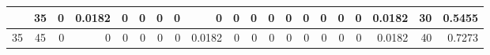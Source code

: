\begin{table}[ht]
\begin{adjustbox}{width = \textwidth, center}
\begin{tabular}{|cc|r|r|r|r|r|r|r|r|r|r|r|r|r|r|r|rrr|}
        \rowcolor[HTML]{FFFFFF} 
        \cellcolor[HTML]{C9DAF8}\enskip 25 \enskip             & \cellcolor[HTML]{EBF1FC}35             & 0                                              & \cellcolor[HTML]{DEF2E8}0.0182                 & 0                                              & 0                                              & 0                                              & 0                                              & 0                                              & 0                                               & 0                                               & 0                                               & 0                                               & 0                                               & 0                                               & 0                                               & 0                                               & \multicolumn{1}{r|}{\cellcolor[HTML]{D9D2E9}0.0182}                             & \multicolumn{1}{r|}{\cellcolor[HTML]{D9D2E9}30}                         & \cellcolor[HTML]{D9D2E9}0.5455                                                                   \\ \hline
        \rowcolor[HTML]{FFFFFF} 
        \cellcolor[HTML]{C9DAF8}35             & \cellcolor[HTML]{EBF1FC}45             & 0                                              & 0                                              & 0                                              & 0                                              & 0                                              & 0                                              & \cellcolor[HTML]{DEF2E8}0.0182                 & 0                                               & 0                                               & 0                                               & 0                                               & 0                                               & 0                                               & 0                                               & 0                                               & \multicolumn{1}{r|}{\cellcolor[HTML]{D9D2E9}0.0182}                             & \multicolumn{1}{r|}{\cellcolor[HTML]{D9D2E9}40}                         & \cellcolor[HTML]{D9D2E9}0.7273                                                                   \\ \hline

\end{tabular}
\end{adjustbox}
\end{table}
